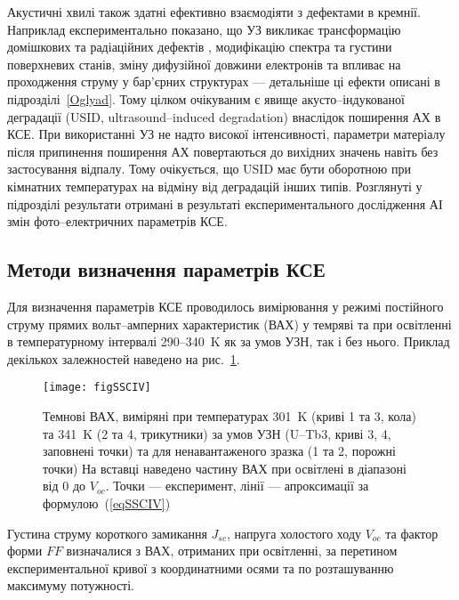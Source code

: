 Акустичні хвилі також здатні ефективно взаємодіяти з дефектами в кремнії.
Наприклад  експериментально показано, що УЗ викликає трансформацію домішкових та радіаційних дефектів \cite{Korotchenkov1995,Ostapenko1995,UST:Medvid,YOlikh:SupMicr},
модифікацію спектра \cite{Zaver:2008} та густини \cite{Mirsagatov} поверхневих станів,
зміну дифузійної довжини електронів \cite{Ostapenko1999,Ostrovskii2001}
та впливає на проходження струму у бар'єрних структурах \cite{Davletova2009,Davletova2008,YOlikh2005} ---
детальніше ці ефекти описані в підрозділі~\ref{Oglyad}.
 Тому цілком очікуваним є явище акусто--індукованої деградації (USID, ultrasound--induced degradation) внаслідок поширення АХ в КСЕ.
При використанні УЗ не надто високої інтенсивності, параметри матеріалу після припинення поширення АХ повертаються до вихідних значень \cite{Ostapenko1999,Ostrovskii2001,Korotchenkov1995} навіть без застосування відпалу.
Тому очікується, що USID має бути оборотною при кімнатних температурах на відміну від деградацій інших типів.
Розглянуті у підрозділі результати отримані в результаті експериментального дослідження АІ змін фото--електричних параметрів КСЕ.

\subsection{Методи визначення параметрів КСЕ\label{sbSSCMethod}}
Для визначення параметрів КСЕ проводилось вимірювання у режимі постійного струму прямих вольт--амперних характеристик (ВАХ) у темряві та при освітленні
в температурному інтервалі  290--340~K як за умов УЗН, так і без нього.
Приклад декількох залежностей наведено на рис.~\ref{figSSCIV}.
\begin{figure}
\center
\texttt{[image: figSSCIV]}%
\caption{\label{figSSCIV}
Темнові ВАХ, виміряні при температурах 301~K (криві 1 та 3, кола) та 341~K (2 та 4, трикутники)
за умов УЗН (U--Tb3, криві 3, 4, заповнені точки) та для ненавантаженого зразка (1 та 2, порожні точки)
На вставці наведено частину ВАХ при освітлені в діапазоні від 0 до $V_{oc}$.
Точки --- експеримент, лінії --- апроксимації за формулою~(\ref{eqSSCIV})
}%
\end{figure}
Густина струму короткого замикання $J_{sc}$, напруга холостого ходу $V_{oc}$ та фактор форми $F\!F$ визначалися з ВАХ, отриманих при освітленні,
за перетином експериментальної кривої з координатними осями  та по розташуванню максимуму потужності.


